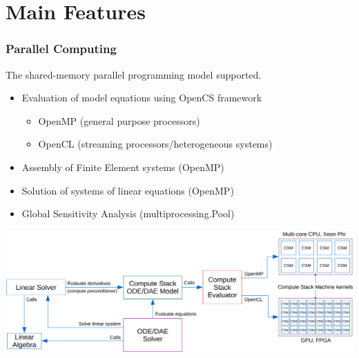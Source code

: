 \documentclass[compress,newPxFont,sthlmFooter]{beamer}
\begin{document}

\section{Main Features}

\begin{frame}[plain]
\frametitle{Parallel Computing}
    The \alert{shared-memory} parallel programming model supported.
    \begin{itemize}
      \item \alert{Evaluation of model equations} using \alert{OpenCS} framework
         \begin{itemize}
            \item \alert{OpenMP} (general purpose processors)
            \item \alert{OpenCL} (streaming processors/heterogeneous systems)
         \end{itemize}   
      \item \alert{Assembly of Finite Element systems} (OpenMP)
      \item \alert{Solution of systems of linear equations} (OpenMP)
      \item \alert{Global Sensitivity Analysis} (multiprocessing.Pool)
    \end{itemize}
    \begin{center}
        \includegraphics[align=c, height=0.37\paperheight]{Simulation-SharedMemorySystems.png}
    \end{center}
\end{frame}
\end{document}
